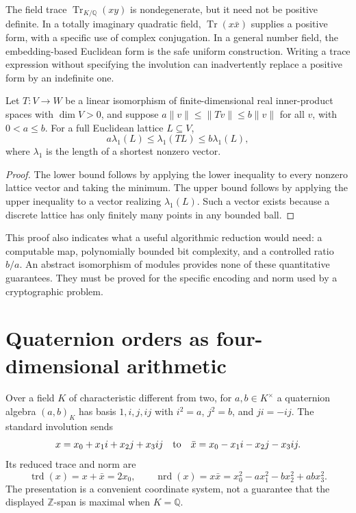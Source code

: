 The field trace $\operatorname{Tr}_{K/\mathbb Q}(xy)$ is
nondegenerate, but it need not be positive definite. In a totally
imaginary quadratic field, $\operatorname{Tr}(x\bar x)$ supplies
a positive form, with a specific use of complex conjugation. In a
general number field, the embedding-based Euclidean form is the
safe uniform construction. Writing a trace expression without
specifying the involution can inadvertently replace a positive
form by an indefinite one.

\begin{proposition}
Let $T:V\to W$ be a linear isomorphism of finite-dimensional
real inner-product spaces with $\dim V>0$, and suppose
$a\|v\|\le\|Tv\|\le b\|v\|$ for all $v$, with
$0<a\le b$. For a full Euclidean lattice $L\subseteq V$,
\[
 a\lambda_1(L)\le\lambda_1(TL)\le b\lambda_1(L),
\]
where $\lambda_1$ is the length of a shortest nonzero vector.
\end{proposition}

\begin{proof}
The lower bound follows by applying the lower inequality to every
nonzero lattice vector and taking the minimum. The upper bound
follows by applying the upper inequality to a vector realizing
$\lambda_1(L)$. Such a vector exists because a discrete lattice
has only finitely many points in any bounded ball.
\end{proof}

This proof also indicates what a useful algorithmic reduction would
need: a computable map, polynomially bounded bit complexity, and a
controlled ratio $b/a$. An abstract isomorphism of modules provides
none of these quantitative guarantees. They must be proved for the
specific encoding and norm used by a cryptographic problem.

\section{Quaternion orders as four-dimensional arithmetic}

Over a field $K$ of characteristic different from two, for $a,b\in K^\times$ a quaternion
algebra $(a,b)_K$ has basis $1,i,j,ij$ with
$i^2=a$, $j^2=b$, and $ji=-ij$. The standard involution sends
\[
 x=x_0+x_1i+x_2j+x_3ij\quad\hbox{to}\quad
 \bar x=x_0-x_1i-x_2j-x_3ij.
\]
Its reduced trace and norm are
\[
 \operatorname{trd}(x)=x+\bar x=2x_0,\qquad
 \operatorname{nrd}(x)=x\bar x
  =x_0^2-a x_1^2-b x_2^2+ab x_3^2.
\]
The presentation is a convenient coordinate system, not a guarantee
that the displayed $\mathbb Z$-span is maximal when $K=\mathbb Q$.


